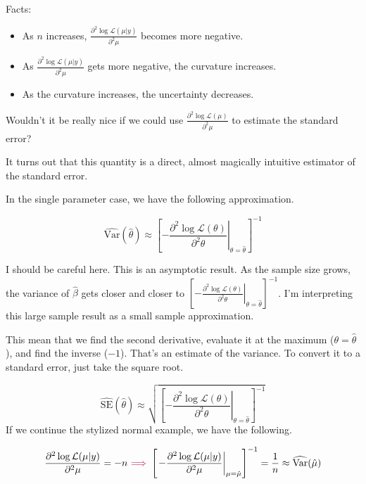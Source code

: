 \documentclass[
]{book}
\providecommand{\tightlist}{%
  \setlength{\itemsep}{0pt}\setlength{\parskip}{0pt}}
\begin{document}
Facts:

\begin{itemize}
\tightlist
\item
  As \(n\) increases, \(\frac{\partial^2 \log \mathcal{L}(\mu | y)}{\partial^2 \mu}\) becomes more negative.
\item
  As \(\frac{\partial^2 \log \mathcal{L}(\mu | y)}{\partial^2 \mu}\) gets more negative, the curvature increases.
\item
  As the curvature increases, the uncertainty decreases.
\end{itemize}

Wouldn't it be really nice if we could use \(\frac{\partial^2 \log \mathcal{L}(\mu)}{\partial^2 \mu}\) to estimate the standard error?

It turns out that this quantity is a direct, almost magically intuitive estimator of the standard error.

In the single parameter case, we have the following approximation.

\[
\widehat{\text{Var}}(\hat{\theta}) \approx \left[\left. - \frac{\partial^2 \log \mathcal{L}(\theta)}{\partial^2 \theta}\right| _{\theta = \hat{\theta}}\right] ^{-1}
\]

I should be careful here. This is an asymptotic result. As the sample size grows, the variance of \(\hat{\beta}\) gets closer and closer to \(\left[\left. - \frac{\partial^2 \log \mathcal{L}(\theta)}{\partial^2 \theta}\right| _{\theta = \hat{\theta}}\right] ^{-1}\). I'm interpreting this large sample result as a small sample approximation.

This mean that we find the second derivative, evaluate it at the maximum (\(\theta = \hat{\theta}\)), and find the inverse (\(-1\)). That's an estimate of the variance. To convert it to a standard error, just take the square root.

\[
\widehat{\text{SE}}(\hat{\theta}) \approx \sqrt{\left[\left. - \frac{\partial^2 \log \mathcal{L}(\theta)}{\partial^2 \theta}\right| _{\theta = \hat{\theta}}\right] ^{-1}}
\]
If we continue the stylized normal example, we have the following.

\[
\begin{equation*}
\dfrac{\partial^2 \log \mathcal{L}(\mu | y)}{\partial^2 \mu} =  - n
 ~{\color{purple}{\Longrightarrow}}~
\left[\left. - \frac{\partial^2 \log \mathcal{L}(\mu | y)}{\partial^2 \mu}\right| _{\mu = \hat{\mu}}\right] ^{-1} 
 = \dfrac{1}{n} 
\approx \widehat{\text{Var}}(\hat{\mu})
\end{equation*}
\]
\end{document}
